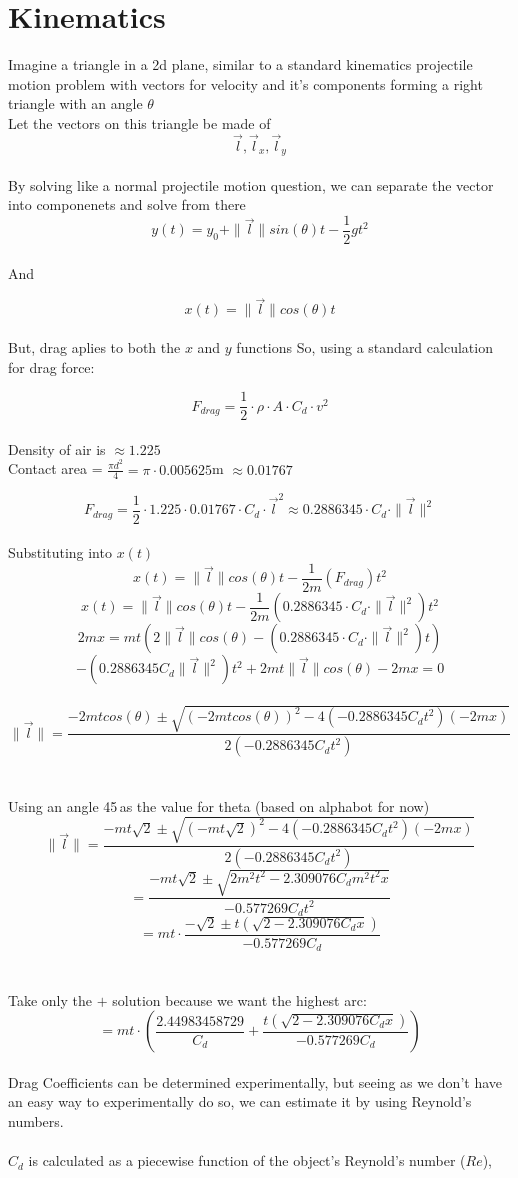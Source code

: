 \documentclass{article}
\begin{document}
\section{Kinematics}

Imagine a triangle in a 2d plane, similar to a standard kinematics projectile motion problem with vectors for velocity and it's components forming a right triangle with an angle $\theta$
\\
Let the vectors on this triangle be made of 
\[
\vec{l} , \vec{l}_x , \vec{l}_y
\]
\\
By solving like a normal projectile motion question, we can separate the vector into componenets and solve from there
\[y(t) = y_0 + \|\vec{l}\|sin(\theta) t - \frac{1}{2}gt^{2}\]
\\
And

\[x(t) = \|\vec{l}\|cos(\theta) t\]
\\
But, drag aplies to both the $x$ and $y$ functions
So, using a standard calculation for drag force:

\[F_{drag} = \frac{1}{2} \cdot \rho \cdot A \cdot C_d \cdot v^2\]
\\
Density of air is $\approx{1.225}$\\
Contact area = $\frac{\pi d^2}{4} = \pi \cdot 0.005625$m $\approx 0.01767$




\[F_{drag} = \frac{1}{2} \cdot 1.225 \cdot 0.01767 \cdot C_d \cdot \vec{l}^2 \approx 0.2886345 \cdot C_d \cdot \|\vec{l}\|^2\]
\\
Substituting into $x(t)$
\[x(t) = \|\vec{l}\|cos(\theta) t - \frac{1}{2m}(F_{drag})t^2\]
\[x(t) = \|\vec{l}\|cos(\theta) t - \frac{1}{2m}(0.2886345 \cdot C_d \cdot \|\vec{l}\|^2)t^2\]
\[2mx = mt(2\|\vec{l}\|cos(\theta) - (0.2886345 \cdot C_d \cdot \|\vec{l}\|^2)t)\]
\[-(0.2886345C_d\|\vec{l}\|^2)t^2+2mt\|\vec{l}\|cos(\theta)-2mx = 0\]
\\
\[\|\vec{l}\| = \frac{-2mtcos(\theta) \pm \sqrt{(-2mtcos(\theta))^2 - 4(-0.2886345C_dt^2)(-2mx)}}{2(-0.2886345C_dt^2)}  \]
\\
\\
Using an angle 45\textdegree \,as the value for theta (based on alphabot for now)
\[\|\vec{l}\| = \frac{-mt\sqrt{2} \pm \sqrt{(-mt\sqrt{2})^2 - 4(-0.2886345C_dt^2)(-2mx)}}{2(-0.2886345C_dt^2)}\]
\[ = \frac{-mt\sqrt{2} \pm \sqrt{2m^2t^2 - 2.309076C_dm^2t^2x}}{-0.577269C_dt^2}\]
\[ = mt \cdot \frac{-\sqrt{2} \pm t(\sqrt{2 - 2.309076C_dx})}{-0.577269C_d}\]
\\\\
Take only the $+$ solution because we want the highest arc:
\[ = mt \cdot (\frac{2.44983458729}{C_d} + \frac{t(\sqrt{2 - 2.309076C_dx})}{-0.577269C_d})\]
\\
Drag Coefficients can be determined experimentally, but seeing as we don't have an easy way to experimentally do so, we can estimate it by using Reynold's numbers. 
\\\\
$C_d$ is calculated as a piecewise function of the object's Reynold's number ($Re$), 
\end{document}
